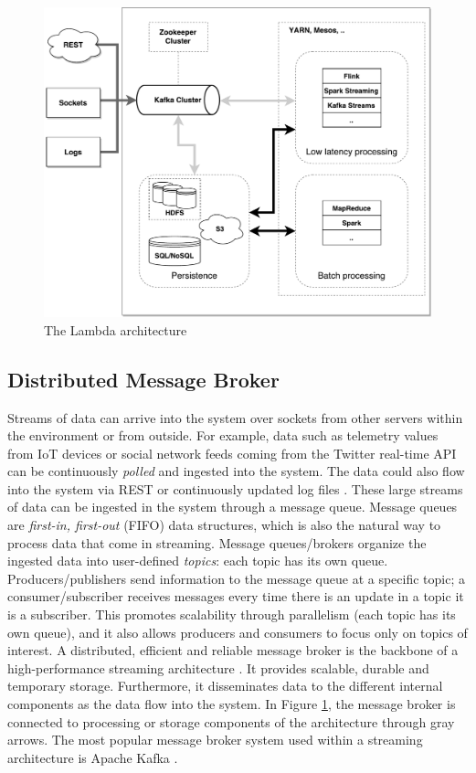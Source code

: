  \begin{figure}[ht!]
\includegraphics[width=1\textwidth]{images/streaming_architecture.pdf}
 \caption{The Lambda architecture}
\label{fig:lambda_architecture}
\end{figure}

\subsection{Distributed Message Broker}
Streams of data can arrive into the system over sockets from other servers within the environment or from outside. For example, data such as telemetry values from IoT devices or social network feeds coming from the Twitter real-time API \cite{twitterrealtimeapi} can be continuously \emph{polled} and ingested into the system. The data could also flow into the system via REST or continuously updated log files \cite{fastdataarchitecture}. These large streams of data can be ingested in the system through a message queue. Message queues are \emph{first-in, first-out} (FIFO) data structures, which is also the natural way to process data that come in streaming. Message queues/brokers organize the ingested data into user-defined \emph{topics}: each topic has its own queue. Producers/publishers send information to the message queue at a specific topic; a consumer/subscriber receives messages every time there is an update in a topic it is a subscriber. This promotes scalability through parallelism (each topic has its own queue), and it also allows producers and consumers to focus only on topics of interest. A distributed, efficient and reliable message broker is the backbone of a high-performance streaming architecture \cite{fastdataarchitecture}. It provides scalable, durable and temporary storage. Furthermore, it disseminates data to the different internal components as the data flow into the system. In Figure \ref{fig:lambda_architecture}, the message broker is connected to processing or storage components of the architecture through gray arrows. The most popular message broker system used within a streaming architecture is Apache Kafka \cite{apachekafkaonline}. 
